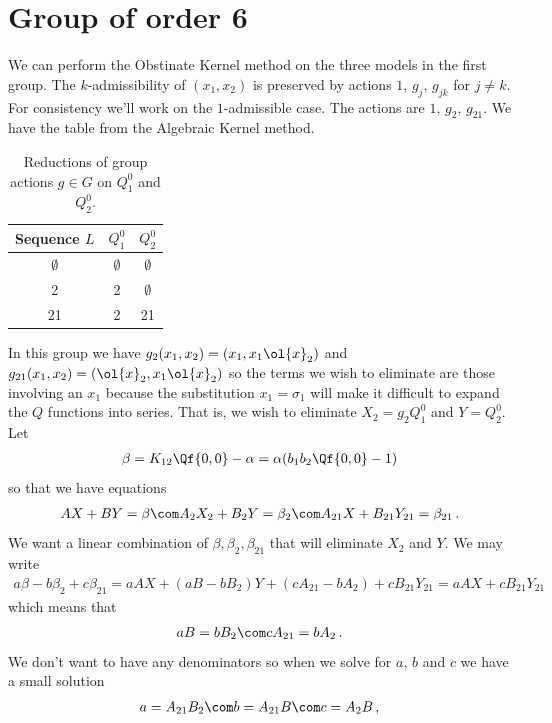 \section{Group of order 6}
We can perform the Obstinate Kernel method on the three models in the first group. The $k$-admissibility of $(x_1,x_2)$ is preserved by actions $1,\, g_j,\, g_{jk}$ for $j \neq k$. For consistency we'll work on the $1$-admissible case. The actions are $1,\, g_2,\, g_{21}$. We have the table from the Algebraic Kernel method.
\begin{table}[H]
    \caption{Reductions of group actions $g \in G$ on $Q_1^0$ and $Q_2^0$.}
    \label{tbl:tableG6}
    \centering
    \begin{tabular}{ccc}
    \toprule
    Sequence $L$ & $Q_1^0$ & $Q_2^0$ \\  
    \midrule
      $\emptyset$ & $\emptyset$ & $\emptyset$  \\
      2 &  2& $\emptyset$ \\
      21 &  2& 21  \\
    \bottomrule
    \end{tabular}
\end{table}
In this group we have $g_2(x_1,x_2) = (x_1,x_1\ol{x}_2)$ and $g_{21}(x_1,x_2) = (\ol{x}_2,x_1\ol{x}_2)$ so the terms we wish to eliminate are those involving an $x_1$ because the substitution $x_1 = \sigma_1$ will make it difficult to expand the $Q$ functions into series. That is, we wish to eliminate $X_2 = g_2Q_1^0$ and $Y = Q_2^0$. Let
\begin{align}
	\beta = K_{12}\Qf{0,0} - \alpha = \alpha(b_1b_2\Qf{0,0}-1)
\end{align}
so that we have equations
\begin{align}
	AX+BY = \beta\com A_2X_2+B_2Y = \beta_2\com A_{21}X+B_{21}Y_{21} = \beta_{21}\,.		
\end{align}
We want a linear combination of $\beta, \beta_2, \beta_{21}$ that will eliminate $X_2$ and $Y$. We may write
\begin{align}
	a\beta - b\beta_2+c \beta_{21} = aAX + (aB-bB_2)Y + (cA_{21}-bA_2) + cB_{21}Y_{21} = aAX + cB_{21}Y_{21}
\end{align}
which means that
\begin{align}
	aB = bB_2\com cA_{21} = b A_2\,.
\end{align}
We don't want to have any denominators so when we solve for $a$, $b$ and $c$ we have a small solution
\begin{align}
	a = A_{21}B_2\com b= A_{21}B\com c = A_2B\,,
\end{align}
